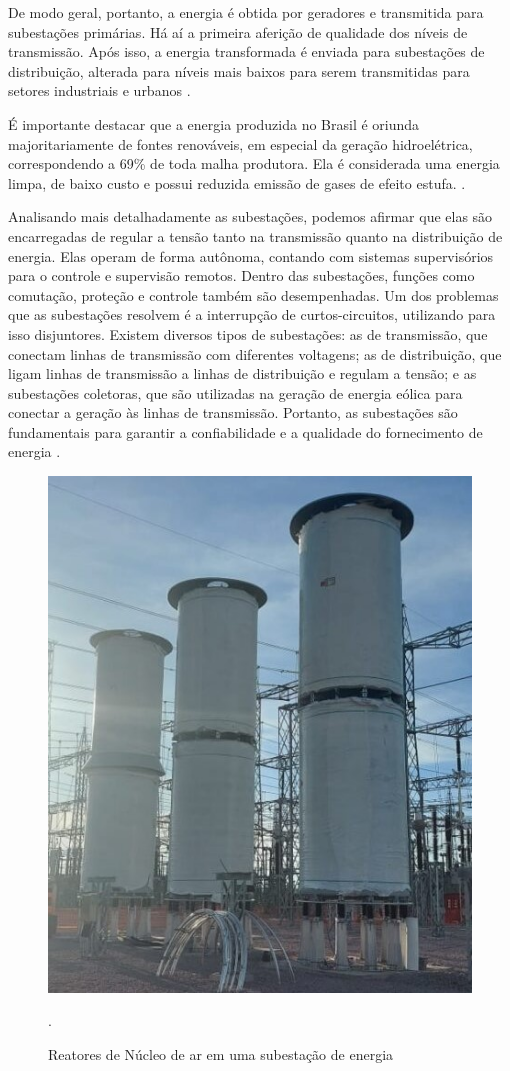 De modo geral, portanto, a energia é obtida por geradores e transmitida para subestações primárias. Há aí a primeira aferição de qualidade dos níveis de transmissão. Após isso, a energia transformada é enviada para subestações de distribuição, alterada para níveis mais baixos para serem transmitidas para setores industriais e urbanos \cite {barreto2022proposta}.

É importante destacar que a energia produzida no Brasil é oriunda majoritariamente de fontes renováveis, em especial da geração hidroelétrica, correspondendo a 69\% de toda malha produtora. Ela é considerada uma energia limpa, de baixo custo e possui reduzida emissão de gases de efeito estufa. \cite {de2015hydroelectric}. 

Analisando mais detalhadamente as subestações, podemos afirmar que elas são encarregadas de regular a tensão tanto na transmissão quanto na distribuição de energia. Elas operam de forma autônoma, contando com sistemas supervisórios para o controle e supervisão remotos. Dentro das subestações, funções como comutação, proteção e controle também são desempenhadas. Um dos problemas que as subestações resolvem é a interrupção de curtos-circuitos, utilizando para isso disjuntores. Existem diversos tipos de subestações: as de transmissão, que conectam linhas de transmissão com diferentes voltagens; as de distribuição, que ligam linhas de transmissão a linhas de distribuição e regulam a tensão; e as subestações coletoras, que são utilizadas na geração de energia eólica para conectar a geração às linhas de transmissão. Portanto, as subestações são fundamentais para garantir a confiabilidade e a qualidade do fornecimento de energia  \cite{lopes2012smart}.

\begin{figure}[!h]
    \centering
    \begin{minipage}{0.5\linewidth}
    \centering
    \captionsetup{justification=centering,margin=0.5cm,font=small}
    \includegraphics[width=0.7\linewidth]{img/cap2/reator-ar.jpeg}
    \caption{Reatores de Núcleo de ar em uma subestação de energia \cite{reatorNucleoDeAr}}.
    \label{fig:reator}
    \end{minipage}
\end{figure}

